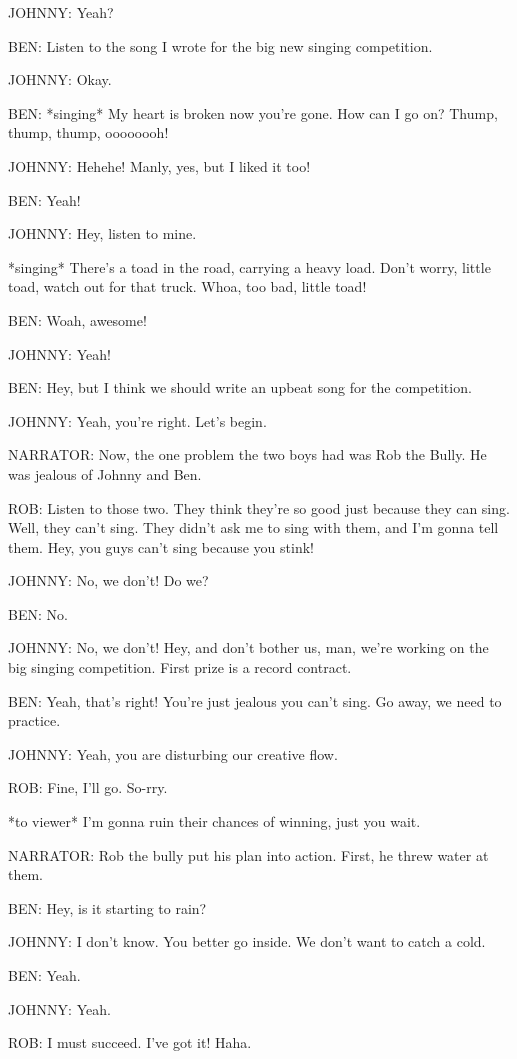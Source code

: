 JOHNNY:
Yeah?

BEN:
Listen to the song I wrote for the big new singing competition.

JOHNNY:
Okay.

BEN:
*singing*
My heart is broken now you're gone.
How can I go on?
Thump, thump, thump, oooooooh!

JOHNNY:
Hehehe!
Manly, yes, but I liked it too!

BEN:
Yeah!

JOHNNY:
Hey, listen to mine.

*singing*
There's a toad in the road, carrying a heavy load.
Don't worry, little toad, watch out for that truck.
Whoa, too bad, little toad!

BEN:
Woah, awesome!

JOHNNY:
Yeah!

BEN:
Hey, but I think we should write an upbeat song for the competition.

JOHNNY:
Yeah, you're right.
Let's begin.

NARRATOR:
Now, the one problem the two boys had was Rob the Bully.
He was jealous of Johnny and Ben.

ROB:
Listen to those two.
They think they're so good just because they can sing.
Well, they can't sing.
They didn't ask me to sing with them, and I'm gonna tell them.
Hey, you guys can't sing because you stink!

JOHNNY:
No, we don't!
Do we?

BEN:
No.

JOHNNY:
No, we don't!
Hey, and don't bother us, man, we're working on the big singing competition.
First prize is a record contract.

BEN:
Yeah, that's right!
You're just jealous you can't sing.
Go away, we need to practice.

JOHNNY:
Yeah, you are disturbing our creative flow.

ROB:
Fine, I'll go.
So-rry.

*to viewer*
I'm gonna ruin their chances of winning, just you wait.

NARRATOR:
Rob the bully put his plan into action.
First, he threw water at them.

BEN:
Hey, is it starting to rain?

JOHNNY:
I don't know.
You better go inside.
We don't want to catch a cold.

BEN:
Yeah.

JOHNNY:
Yeah.

ROB:
I must succeed.
I've got it!
Haha.

